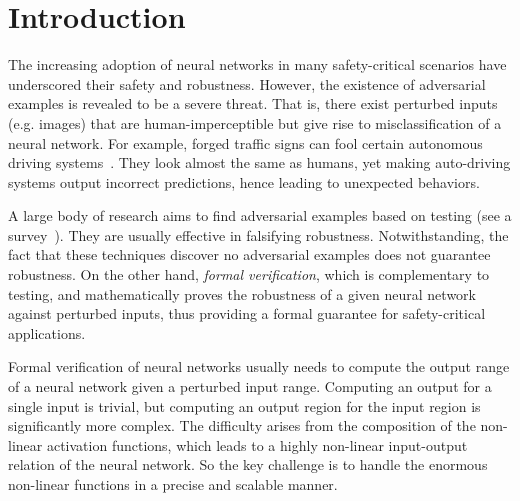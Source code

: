 \documentclass[runningheads]{llncs}
\begin{document}
\section{Introduction}

The increasing adoption of neural networks in many safety-critical
scenarios have underscored their safety and robustness. However, the
existence of adversarial examples is revealed to be a severe threat.
That is, there exist perturbed inputs (e.g. images) that are
human-imperceptible but give rise to misclassification of a neural
network. For example, forged traffic signs can fool certain
autonomous driving systems~\cite{DBLP:journals/corr/abs-1907-00374}.
They look almost the same as humans, yet making auto-driving systems
output incorrect predictions, hence leading to unexpected behaviors.


A large body of research aims to find adversarial examples based on testing
(see a survey~\cite{ZhangHML22}).
They are usually effective in falsifying robustness.
Notwithstanding, the fact that these techniques discover no adversarial examples
does not guarantee robustness.
On the other hand, \emph{formal verification},
which is complementary to testing, and mathematically proves the robustness of a given
neural network against perturbed inputs,
thus providing a formal guarantee for safety-critical applications.


Formal verification of neural networks usually needs to compute the output range
of a neural network given a perturbed input range.
Computing an output for a single input is trivial,
but computing an output region for the input region is significantly more complex.
The difficulty arises from the composition of the non-linear activation functions,
which leads to a highly non-linear input-output relation of the neural network.
So the key challenge is to handle the enormous non-linear functions in a precise
and scalable manner.
\end{document}
